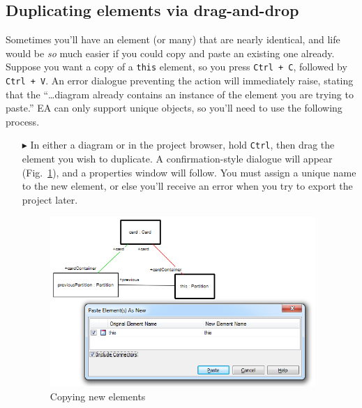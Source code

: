 \newpage

\subsection{Duplicating elements via drag-and-drop}

Sometimes you'll have an element (or many) that are nearly identical, and life would be \emph{so} much easier if you could copy and paste an existing one
already. Suppose you want a copy of a \texttt{this} element, so you press \texttt{Ctrl + C}, followed by \texttt{Ctrl + V}. An error dialogue preventing the
action will immediately raise, stating that the ``\ldots diagram already contains an instance of the element you are trying to paste.'' EA can only support
unique objects, so you'll need to use the following process.

\begin{itemize}

\item[$\blacktriangleright$] In either a diagram or in the project browser, hold \texttt{Ctrl}, then drag the element you wish to duplicate. A
confirmation-style dialogue will appear (Fig.~\ref{ea:dupWindow}), and a properties window will follow. You must assign a unique name to the new element, or
else you'll receive an error when you try to export the project later.

\vspace{0.5cm}

\begin{figure}[htbp]
\begin{center}
  \includegraphics[width=0.95\textwidth]{ea_duplicatingElements}
  \caption{Copying new elements}  
  \label{ea:dupWindow}
\end{center}
\end{figure}

\end{itemize}
